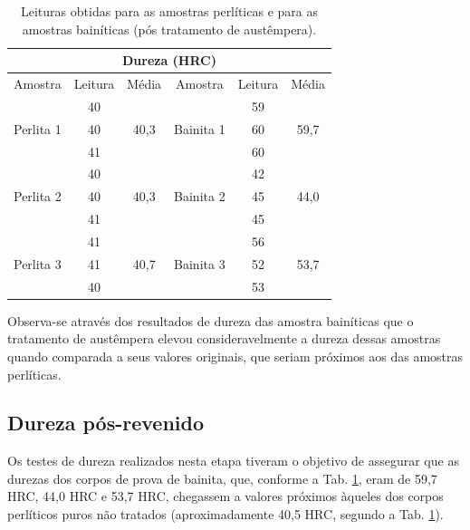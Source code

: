 \documentclass[
12pt,
openany, %
oneside, %
a4paper,			
english,			
brazil			        %
]{abntbibufjf}
\begin{document}
	\begin{table}[H]
		\centering
		\caption{Leituras obtidas para as amostras perlíticas e para as amostras bainíticas (pós tratamento de austêmpera).}
		\begin{tabular}{|ccc|ccc|}
			\hline
			\multicolumn{6}{|c|}{Dureza (HRC)} \bigstrut\\
			\hline
			Amostra    & Leitura    & Média      & Amostra    & Leitura    & Média \bigstrut\\
			\hline
			\multirow{3}[2]{*}{Perlita 1} & 40         & \multirow{3}[2]{*}{40,3} & \multirow{3}[2]{*}{Bainita 1} & 59         & \multirow{3}[2]{*}{59,7} \bigstrut[t]\\
			& 40         &            &            & 60         &  \\
			& 41         &            &            & 60         &  \bigstrut[b]\\
			\hline
			\multirow{3}[2]{*}{Perlita 2} & 40         & \multirow{3}[2]{*}{40,3} & \multirow{3}[2]{*}{Bainita 2} & 42         & \multirow{3}[2]{*}{44,0} \bigstrut[t]\\
			& 40         &            &            & 45         &  \\
			& 41         &            &            & 45         &  \bigstrut[b]\\
			\hline
			\multirow{3}[2]{*}{Perlita 3} & 41         & \multirow{3}[2]{*}{40,7} & \multirow{3}[2]{*}{Bainita 3} & 56         & \multirow{3}[2]{*}{53,7} \bigstrut[t]\\
			& 41         &            &            & 52         &  \\
			& 40         &            &            & 53         &  \bigstrut[b]\\
			\hline
		\end{tabular}%
		\label{tab:dureza_pos_austempera}%
	\end{table}%
	
	Observa-se através dos resultados de dureza das amostra bainíticas que o tratamento de austêmpera elevou consideravelmente a dureza dessas amostras quando comparada a seus valores originais, que seriam próximos aos das amostras perlíticas.
	
\subsection{Dureza pós-revenido}
\label{sec:analise_dureza_pos_revenido}
	Os testes de dureza realizados nesta etapa tiveram o objetivo de assegurar que as durezas dos corpos de prova de bainita, que, conforme a Tab. \ref{tab:dureza_pos_austempera}, eram de 59,7 HRC, 44,0 HRC e 53,7 HRC, chegassem a valores próximos àqueles dos corpos perlíticos puros não tratados (aproximadamente 40,5 HRC, segundo a Tab. \ref{tab:dureza_pos_austempera}). 
	
\end{document}
